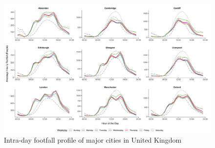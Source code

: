 \begin{figure}
  \forcerectofloat
  \includegraphics[trim={0 10 0 0},clip]{images/applications-city-profiles.png}
  \caption{Intra-day footfall profile of major cities in United Kingdom}
  \label{figure:applications:cities:profiles}
\end{figure}

